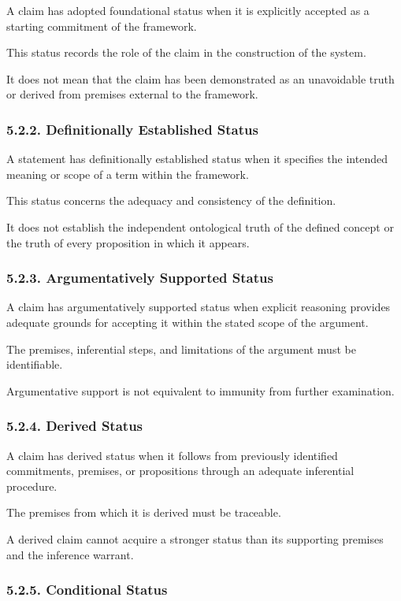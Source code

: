 A claim has adopted foundational
status when it is explicitly accepted
as a starting commitment of the
framework.

This status records the role
of the claim in the construction
of the system.

It does not mean that the claim
has been demonstrated as an
unavoidable truth or derived
from premises external to the
framework.

\subsubsection*{5.2.2. Definitionally Established Status}

A statement has definitionally
established status when it specifies
the intended meaning or scope
of a term within the framework.

This status concerns the adequacy
and consistency of the definition.

It does not establish the independent
ontological truth of the defined
concept or the truth of every
proposition in which it appears.

\subsubsection*{5.2.3. Argumentatively Supported Status}

A claim has argumentatively supported
status when explicit reasoning
provides adequate grounds for
accepting it within the stated
scope of the argument.

The premises, inferential steps,
and limitations of the argument
must be identifiable.

Argumentative support is not
equivalent to immunity from
further examination.

\subsubsection*{5.2.4. Derived Status}

A claim has derived status when
it follows from previously
identified commitments, premises,
or propositions through an
adequate inferential procedure.

The premises from which it is
derived must be traceable.

A derived claim cannot acquire
a stronger status than its
supporting premises and the
inference warrant.

\subsubsection*{5.2.5. Conditional Status}

